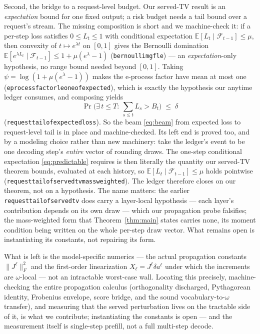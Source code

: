 \documentclass[11pt]{article}
\renewcommand{\_}{\WCorigunderscore\allowbreak}
\begin{document}
Second, the bridge to a request-level budget. Our served-TV result is an
\emph{expectation} bound for one fixed output; a risk budget needs a tail
bound over a request's stream. The missing composition is short and we
machine-check it: if a per-step loss satisfies $0\le L_t\le1$ with
conditional expectation $\mathbb{E}[L_t\mid\mathcal{F}_{t-1}]\le\mu$, then
convexity of $t\mapsto e^{\lambda t}$ on $[0,1]$ gives the Bernoulli
domination $\mathbb{E}[e^{\lambda L_t}\mid\mathcal{F}_{t-1}]\le
1+\mu(e^\lambda-1)$ (\texttt{bernoulli\_mgf\_le}) --- an
\emph{expectation}-only hypothesis, no range bound needed beyond
$[0,1]$. Taking $\psi=\log(1+\mu(e^\lambda-1))$ makes the e-process
factor have mean at most one
(\texttt{eprocess\_factor\_le\_one\_of\_expected}), which is exactly the
hypothesis our anytime ledger consumes, and composing yields
\begin{equation}\label{eq:beam}
  \Pr\Big(\exists\,t\le T:\ \textstyle\sum_{s\le t}L_s>B_t\Big)\;\le\;\delta
\end{equation}
(\texttt{request\_tail\_of\_expected\_loss}). So the beam \eqref{eq:beam} from expected loss to request-level tail is
in place and machine-checked.
Its left end is proved too, and by a modeling choice rather
than new machinery: take the ledger's event to be one decoding step's
\emph{entire} vector of rounding draws. The one-step conditional
expectation \eqref{eq:predictable} requires is then literally the
quantity our served-TV theorem bounds, evaluated at each history, so
$\mathbb{E}[L_t\mid\mathcal{F}_{t-1}]\le\mu$ holds pointwise
(\texttt{request\_tail\_of\_served\_tv\_massweighted}). The ledger
therefore closes on our theorem, not on a hypothesis. The name matters:
the earlier \texttt{request\_tail\_of\_served\_tv} does carry a
layer-local hypothesis --- each layer's contribution depends on its own
draw --- which our propagation probe falsifies; the mass-weighted form
that Theorem~\ref{thm:main} states carries none, its moment condition
being written on the whole per-step draw vector. What remains open is
instantiating its constants, not repairing its form.

What is left is the model-specific numerics --- the actual propagation
constants $\|J^\ell\|_F^2$ and the first-order linearization
$X_\ell=J^\ell\delta a^\ell$ under which the increments are
$\omega$-local --- not an intractable worst-case wall. Locating this precisely,
machine-checking the entire propagation calculus (orthogonality
discharged, Pythagorean identity, Frobenius envelope, score bridge, and
the sound vocabulary-to-$\omega$ transfer), and measuring that the served
perturbation lives on the tractable side of it, is what we contribute;
instantiating the constants is open --- and the measurement itself is
single-step prefill, not a full multi-step decode.
\end{document}
